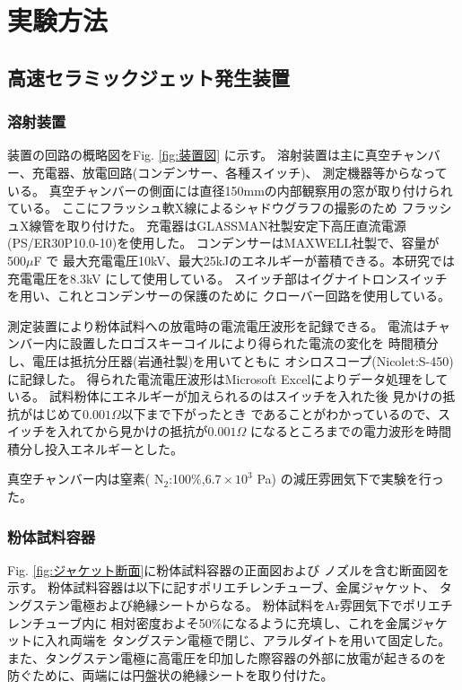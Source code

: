 
\chapter{実験方法}

\section{高速セラミックジェット発生装置}

\subsection{溶射装置}

装置の回路の概略図をFig. \ref{fig:装置図} に示す。
溶射装置は主に真空チャンバー、充電器、放電回路(コンデンサー、各種スイッチ)、
測定機器等からなっている。
真空チャンバーの側面には直径150mmの内部観察用の窓が取り付けられている。
ここにフラッシュ軟X線によるシャドウグラフの撮影のため
フラッシュX線管を取り付けた。
充電器はGLASSMAN社製安定下高圧直流電源(PS/ER30P10.0-10)を使用した。
コンデンサーはMAXWELL社製で、容量が 500$\mu$F で
最大充電電圧10kV、最大25kJのエネルギーが蓄積できる。本研究では
充電電圧を8.3kV にして使用している。
スイッチ部はイグナイトロンスイッチを用い、これとコンデンサーの保護のために
クローバー回路を使用している。

測定装置により粉体試料への放電時の電流電圧波形を記録できる。
電流はチャンバー内に設置したロゴスキーコイルにより得られた電流の変化を
時間積分し、電圧は抵抗分圧器(岩通社製)を用いてともに
オシロスコープ(Nicolet:S-450)に記録した。
得られた電流電圧波形はMicrosoft Excelによりデータ処理をしている。
試料粉体にエネルギーが加えられるのはスイッチを入れた後
見かけの抵抗がはじめて$0.001\Omega$以下まで下がったとき
であることがわかっているので、スイッチを入れてから見かけの抵抗が$0.001\Omega$
になるところまでの電力波形を時間積分し投入エネルギーとした。

真空チャンバー内は窒素( N$_2$:100$\%$,$6.7\times 10^3$ Pa)  
の減圧雰囲気下で実験を行った。

\subsection{粉体試料容器} \label{sebsec:粉体試料容器}

Fig. \ref{fig:ジャケット断面}に粉体試料容器の正面図および
ノズルを含む断面図を示す。
粉体試料容器は以下に記すポリエチレンチューブ、金属ジャケット、
タングステン電極および絶縁シートからなる。
粉体試料をAr雰囲気下でポリエチレンチューブ内に
相対密度およそ50\%になるように充填し、これを金属ジャケットに入れ両端を
タングステン電極で閉じ、アラルダイトを用いて固定した。
また、タングステン電極に高電圧を印加した際容器の外部に放電が起きるのを
防ぐために、両端には円盤状の絶縁シートを取り付けた。

